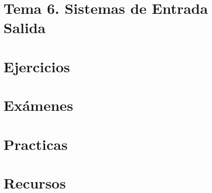 \documentclass[12pt, twoside, openright]{report} %
\begin{document}
\part{Tema 6. Sistemas de Entrada Salida}



\part{Ejercicios}














\part{Exámenes}















\part{Practicas}







\part{Recursos}

\end{document}
